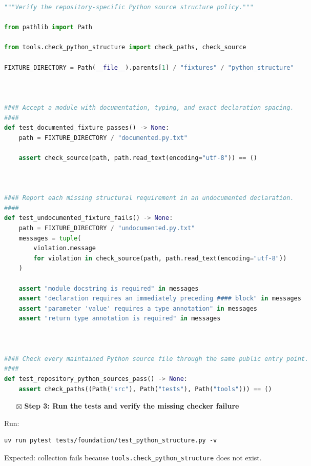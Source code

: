 \documentclass[
  letterpaper,
]{article}
\providecommand{\tightlist}{%
  \setlength{\itemsep}{0pt}\setlength{\parskip}{0pt}}
\begin{document}
\begin{lstlisting}[language=Python]
"""Verify the repository-specific Python source structure policy."""

from pathlib import Path

from tools.check_python_structure import check_paths, check_source

FIXTURE_DIRECTORY = Path(__file__).parents[1] / "fixtures" / "python_structure"



#### Accept a module with documentation, typing, and exact declaration spacing.
####
def test_documented_fixture_passes() -> None:
    path = FIXTURE_DIRECTORY / "documented.py.txt"

    assert check_source(path, path.read_text(encoding="utf-8")) == ()



#### Report each missing structural requirement in an undocumented declaration.
####
def test_undocumented_fixture_fails() -> None:
    path = FIXTURE_DIRECTORY / "undocumented.py.txt"
    messages = tuple(
        violation.message
        for violation in check_source(path, path.read_text(encoding="utf-8"))
    )

    assert "module docstring is required" in messages
    assert "declaration requires an immediately preceding #### block" in messages
    assert "parameter 'value' requires a type annotation" in messages
    assert "return type annotation is required" in messages



#### Check every maintained Python source file through the same public entry point.
####
def test_repository_python_sources_pass() -> None:
    assert check_paths((Path("src"), Path("tests"), Path("tools"))) == ()
\end{lstlisting}

\begin{itemize}
\tightlist
\item[$\boxtimes$]
  \textbf{Step 3: Run the tests and verify the missing checker failure}
\end{itemize}

Run:

\begin{lstlisting}
uv run pytest tests/foundation/test_python_structure.py -v
\end{lstlisting}

Expected: collection fails because \nolinkurl{tools.check_python_structure} does not exist.
\end{document}
